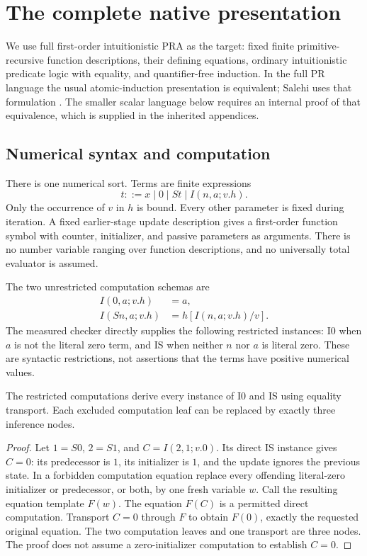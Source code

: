 \section{The complete native presentation}
\label{sec:axioms}

We use full first-order intuitionistic PRA as the target: fixed finite
primitive-recursive function descriptions, their defining equations,
ordinary intuitionistic predicate logic with equality, and quantifier-free
induction. In the full PR language the usual atomic-induction presentation
is equivalent; Salehi uses that formulation \cite{salehi}. The smaller
scalar language below requires an internal proof of that equivalence,
which is supplied in the inherited appendices.

\subsection{Numerical syntax and computation}

There is one numerical sort. Terms are finite expressions
\[
 t ::= x\mid 0\mid St\mid I(n,a;v.h).
\]
Only the occurrence of $v$ in $h$ is bound. Every other parameter is fixed
during iteration. A fixed earlier-stage update description gives a
first-order function symbol with counter, initializer, and passive
parameters as arguments. There is no number variable ranging over
function descriptions, and no universally total evaluator is assumed.

The two unrestricted computation schemas are
\begin{align}
 I(0,a;v.h)&=a,\tag{I0}\label{eq:i0}\\
 I(Sn,a;v.h)&=h[I(n,a;v.h)/v].\tag{IS}\label{eq:is}
\end{align}
The measured checker directly supplies the following restricted instances:
I0 when $a$ is not the literal zero term, and IS when neither $n$ nor $a$
is literal zero. These are syntactic restrictions, not assertions that
the terms have positive numerical values.

\begin{lemma}
\label{lem:zero-repair}
The restricted computations derive every instance of I0 and IS using
equality transport. Each excluded computation leaf can be replaced by
exactly three inference nodes.
\end{lemma}
\begin{proof}
Let $1=S0$, $2=S1$, and $C=I(2,1;v.0)$. Its direct IS instance gives
$C=0$: its predecessor is $1$, its initializer is $1$, and the update
ignores the previous state. In a forbidden computation equation replace
every offending literal-zero initializer or predecessor, or both, by
one fresh variable $w$. Call the resulting equation template $F(w)$.
The equation $F(C)$ is a permitted direct computation. Transport $C=0$
through $F$ to obtain $F(0)$, exactly the requested original equation.
The two computation leaves and one transport are three nodes. The proof
does not assume a zero-initializer computation to establish $C=0$.
\end{proof}

